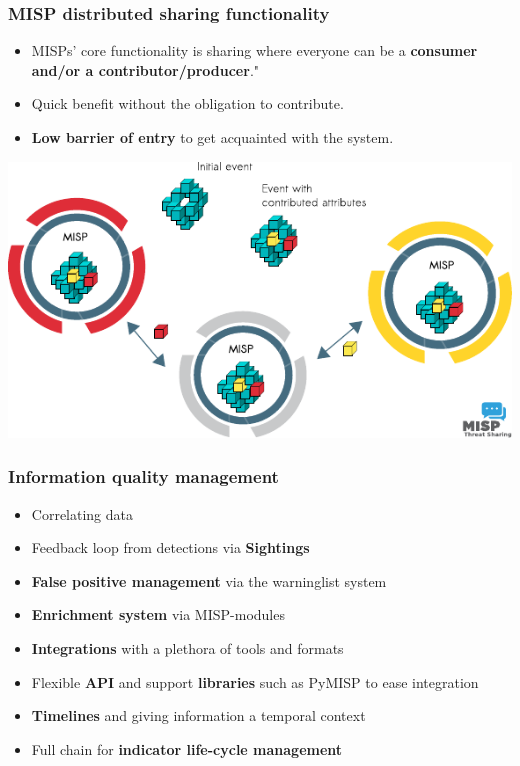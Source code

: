 \begin{frame}
\frametitle{MISP distributed sharing functionality}
\begin{itemize}
\item MISPs' core functionality is sharing where everyone can be a {\bf consumer and/or a contributor/producer}."
\item Quick benefit without the obligation to contribute.
\item {\bf Low barrier of entry} to get acquainted with the system.
\end{itemize}
\includegraphics[scale=0.9]{misp-distributed.pdf}
\end{frame}

\begin{frame}
\frametitle{Information quality management}
    \begin{itemize}
        \item Correlating data
        \item Feedback loop from detections via {\bf Sightings}
        \item {\bf False positive management} via the warninglist system
        \item {\bf Enrichment system} via MISP-modules
        \item {\bf Integrations} with a plethora of tools and formats
        \item Flexible {\bf API} and support {\bf libraries} such as PyMISP to ease integration
        \item {\bf Timelines} and giving information a temporal context
        \item Full chain for {\bf indicator life-cycle management}
    \end{itemize}
\end{frame}

